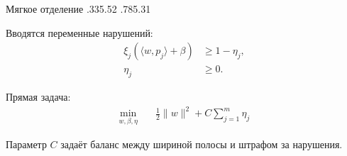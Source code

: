 \SPBGSplitSlide
  {Мягкое отделение}
  {.335}{.52}
  {%
    \ReportSoftMargin
  }
  {.785}{.31}
  {%
    \SplitBody
    Вводятся переменные нарушений:
    \[
      \begin{aligned}
      \xi_j(\langle w,p_j\rangle+\beta)&\geq 1-\eta_j,\\
      \eta_j&\geq0.
      \end{aligned}
    \]

    Прямая задача:
    \[
      \begin{aligned}
      \min_{w,\beta,\eta}\quad&
        \frac12\|w\|^2+C\sum_{j=1}^{m}\eta_j
      \end{aligned}
    \]

    \SplitBody
    Параметр \(C\) задаёт баланс между шириной полосы и штрафом за нарушения.
  }

